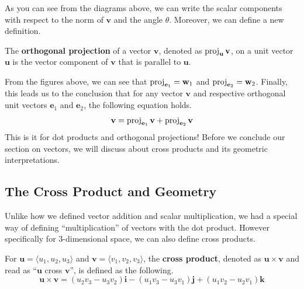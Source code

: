 \documentclass[../../main.tex]{subfiles}
\begin{document}
As you can see from the diagrams above, we can write the scalar
components with respect to the norm of $\mathbf{v}$ and the
angle $\theta$. Moreover, we can define a new definition.

\begin{definition}{}{}
The \textbf{orthogonal projection} of a vector $\mathbf{v}$,
denoted as $\operatorname{proj}_\mathbf{u} \mathbf{v}$, on a unit vector
$\mathbf{u}$ is the vector component of $\mathbf{v}$ that is parallel
to $\mathbf{u}$.
\end{definition}

From the figures above, we can see that $\operatorname{proj}_{\mathbf{e}_1} =
\mathbf{w}_1$ and $\operatorname{proj}_{\mathbf{e}_2} = \mathbf{w}_2$.
Finally, this leads us to the conclusion that for any vector
$\mathbf{v}$ and respective orthogonal unit vectors $\mathbf{e}_1$
and $\mathbf{e}_2$, the following equation holds.
\[
\mathbf{v}
= \operatorname{proj}_{\mathbf{e}_1} \mathbf{v} + \operatorname{proj}_{\mathbf{e}_2} \mathbf{v}
\]
This is it for dot products and orthogonal projections! Before
we conclude our section on vectors, we will discuss about cross
products and its geometric interpretations.

\subsection{The Cross Product and Geometry}

Unlike how we defined vector addition and scalar multiplication,
we had a special way of defining ``multiplication'' of vectors
with the dot product. However specifically for $3$-dimensional
space, we can also define cross products.

\begin{definition}{}{}
For $\mathbf{u} = \langle u_1, u_2, u_3 \rangle$ and $\mathbf{v} =
\langle v_1, v_2, v_3 \rangle$, the \textbf{cross product},
denoted as $\mathbf{u} \times \mathbf{v}$ and read as
``$\mathbf{u}$ cross $\mathbf{v}$'', is defined as the following.
\vspace{-0.8\baselineskip}
\[
\mathbf{u} \times \mathbf{v}
= (u_2v_3 - u_3v_2) \mathbf{i} - (u_1v_3 - u_3v_1) \mathbf{j}
    + (u_1v_2 - u_2v_1) \mathbf{k}
\]
\end{definition}
\end{document}
